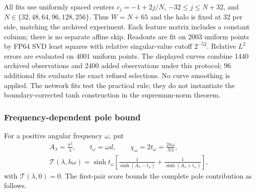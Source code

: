 All fits use uniformly spaced centers
$c_j=-1+2j/N$, $-32\le j\le N+32$, and
$N\in\{32,48,64,96,128,256\}$.
Thus $W=N+65$ and the halo is fixed at 32 per side, matching
the archived experiment. Each feature matrix includes a constant column;
there is no separate affine skip. Readouts are fit on 2003 uniform points
by FP64 SVD least squares with relative singular-value cutoff $2^{-52}$.
Relative $L^2$ errors are evaluated on 4001 uniform points. The displayed
curves combine 1440 archived observations and 2400 added observations under
this protocol; 96 additional fits evaluate the exact refined selections.
No curve smoothing is applied. The network fits test the practical rule;
they do not instantiate the boundary-corrected tanh construction in the
supremum-norm theorem.


\subsubsection{Frequency-dependent pole bound}
For a positive angular frequency $\omega$, put
\begin{equation}
 \begin{gathered}
 A_\lambda=\frac{\pi^2}{\lambda},\qquad
 t_\omega=\omega d,\qquad
 \chi_\omega=2t_\omega=\frac{2\pi\omega}{N\lambda},\\
 \mathcal T(\lambda,h\omega)=\sinh t_\omega
 \left[\frac1{\sinh(A_\lambda-t_\omega)}
       +\frac1{\sinh(A_\lambda+t_\omega)}\right],
 \end{gathered}
 \label{eq:bandwidth-pair}
\end{equation}
with $\mathcal T(\lambda,0)=0$. The first-pair score bounds the complete
pole contribution as follows.

